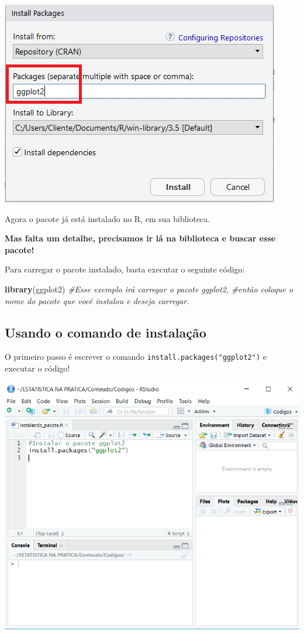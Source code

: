 \documentclass[
]{book}
\newenvironment{Shaded}{\begin{snugshade}}{\end{snugshade}}
\newcommand{\CommentTok}[1]{\textcolor[rgb]{0.56,0.35,0.01}{\textit{#1}}}
\newcommand{\KeywordTok}[1]{\textcolor[rgb]{0.13,0.29,0.53}{\textbf{#1}}}
\newcommand{\NormalTok}[1]{#1}
\begin{document}
\includegraphics{imagens/4_pacotes_install.png}

Agora o pacote já está instalado no R, em sua biblioteca.

\textbf{Mas falta um detalhe, precisamos ir lá na biblioteca e buscar
esse pacote!}

Para carregar o pacote instalado, basta executar o seguinte código:

\begin{Shaded}
\begin{Highlighting}[]
\KeywordTok{library}\NormalTok{(ggplot2) }\CommentTok{#Esse exemplo irá carregar o pacote ggplot2, }
\CommentTok{#então coloque o nome do pacote que você instalou e deseja carregar.}
\end{Highlighting}
\end{Shaded}

\hypertarget{usando-o-comando-de-instalauxe7uxe3o}{%
\subsection{Usando o comando de
instalação}\label{usando-o-comando-de-instalauxe7uxe3o}}

O primeiro passo é escrever o comando
\texttt{install.packages("ggplot2")} e executar o código!

\includegraphics{imagens/4_pacotes_comando_install.png}
\end{document}
